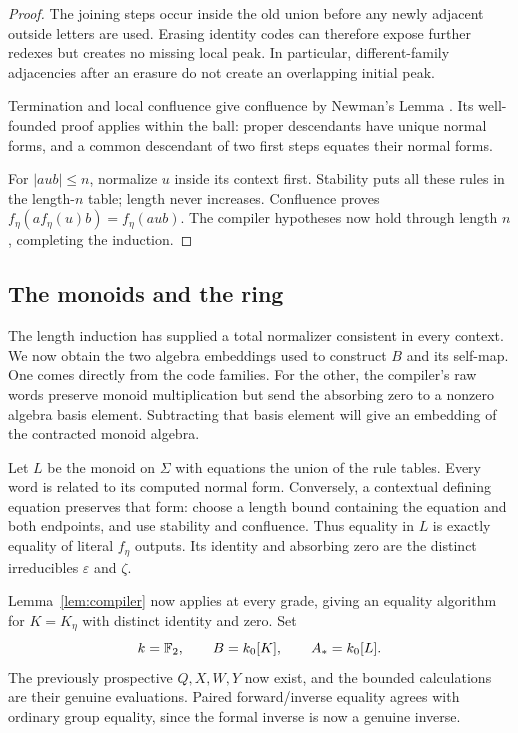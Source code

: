 \begin{proof}
The joining steps occur inside the old
union before any newly adjacent outside
letters are used.  Erasing identity codes
can therefore expose further redexes but
creates no missing local peak.  In particular,
different-family adjacencies after an erasure
do not create an overlapping initial peak.

Termination and local confluence give
confluence by Newman's Lemma \citep{Newman42}.
Its well-founded proof applies within the
ball: proper descendants have unique normal
forms, and a common descendant of two first
steps equates their normal forms.

For $|aub|\leq n$, normalize $u$ inside
its context first.  Stability puts all
these rules in the length-$n$ table;
length never increases.  Confluence proves
$f_\eta(a f_\eta(u)b)=f_\eta(aub)$.
The compiler hypotheses now hold through
length $n$, completing the induction.
\end{proof}

\subsection{The monoids and the ring}

The length induction has supplied a total normalizer consistent in
every context.  We now obtain the two algebra embeddings used to
construct $B$ and its self-map.  One comes directly from the code
families.  For the other, the compiler's raw words preserve monoid
multiplication but send the absorbing zero to a nonzero algebra
basis element.  Subtracting that basis element will give an embedding
of the contracted monoid algebra.

Let $L$ be the monoid on $\Sigma$ with equations
the union of the rule tables.  Every word is
related to its computed normal form.  Conversely,
a contextual defining equation preserves that
form: choose a length bound containing the
equation and both endpoints, and use stability
and confluence.  Thus equality in $L$ is exactly
equality of literal $f_\eta$ outputs.  Its
identity and absorbing zero are the distinct
irreducibles $\varepsilon$ and $\zeta$.

Lemma~\ref{lem:compiler} now applies at every
grade, giving an equality algorithm for
$K=K_\eta$ with distinct identity and zero.
Set
\[
 k=\mathbb F_2,\qquad B=k_0[K],\qquad A_*=k_0[L].
\]
The previously prospective $Q,X,W,Y$
now exist, and the bounded calculations
are their genuine evaluations.  Paired
forward/inverse equality agrees with
ordinary group equality, since the
formal inverse is now a genuine inverse.

